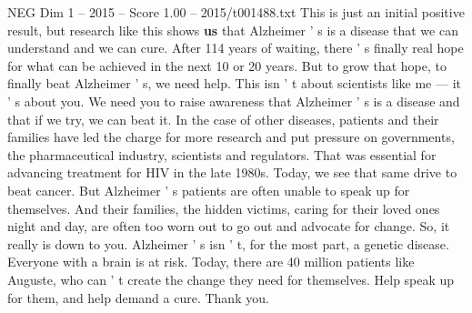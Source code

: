 \begin{textsample}{NEG Dim 1 – 2015 – Score 1.00 – 2015/t001488.txt}
This is just an initial positive result, but research like this shows \textbf{us} that Alzheimer ' s is a disease that we can understand and we can cure.
After 114 years of waiting, there ' s finally real hope for what can be achieved in the next 10 or 20 years.
But to grow that hope, to finally beat Alzheimer ' s, we need help.
This isn ' t about scientists like me — it ' s about you.
We need you to raise awareness that Alzheimer ' s is a disease and that if we try, we can beat it.
In the case of other diseases, patients and their families have led the charge for more research and put pressure on governments, the pharmaceutical industry, scientists and regulators.
That was essential for advancing treatment for HIV in the late 1980s.
Today, we see that same drive to beat cancer.
But Alzheimer ' s patients are often unable to speak up for themselves.
And their families, the hidden victims, caring for their loved ones night and day, are often too worn out to go out and advocate for change.
So, it really is down to you.
Alzheimer ' s isn ' t, for the most part, a genetic disease.
Everyone with a brain is at risk.
Today, there are 40 million patients like Auguste, who can ' t create the change they need for themselves.
Help speak up for them, and help demand a cure.
Thank you.

\end{textsample}

